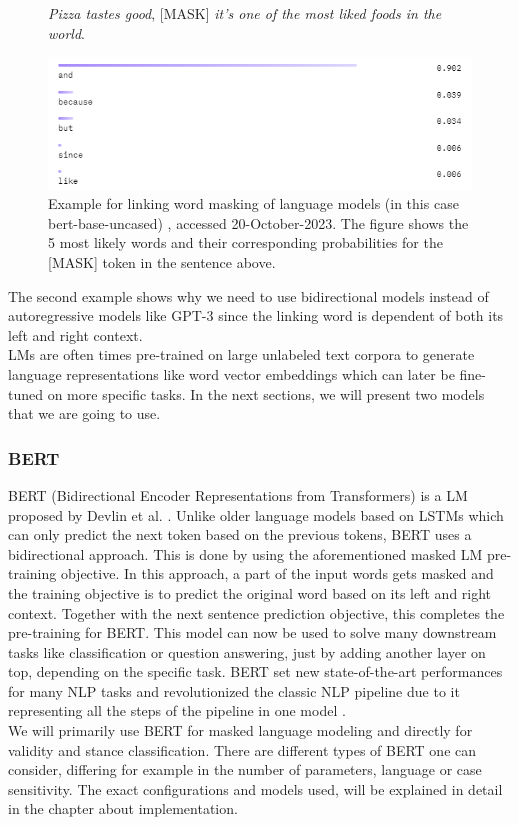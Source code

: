 \begin{figure}[H]
  \begin{center}
	\textit{Pizza tastes good}, [MASK] \textit{it's one of the most liked foods in the world}.
  \end{center}
  \centering
  \includegraphics[scale=0.9]{fig/bert_masking_example2.png}
  \caption{Example for linking word masking of language models (in this case bert-base-uncased) \cite{bertbaseuncased}, accessed 20-October-2023. The figure shows the 5 most likely words and their corresponding probabilities for the [MASK] token in the sentence above.}%
  \label{fig:bert_masking_example2}
\end{figure}

The second example shows why we need to use bidirectional models instead of autoregressive models like GPT-3 since the linking word is dependent of both its left and right context. \\
LMs are often times pre-trained on large unlabeled text corpora to generate language representations like word vector embeddings which can later be fine-tuned on more specific tasks. In the next sections, we will present two models that we are going to use.


\subsubsection{BERT}
BERT (Bidirectional Encoder Representations from Transformers) is a LM proposed by Devlin et al. \cite{bert}. Unlike older language models based on LSTMs which can only predict the next token based on the previous tokens, BERT uses a bidirectional approach. This is done by using the aforementioned masked LM pre-training objective. In this approach, a part of the input words gets masked and the training objective is to predict the original word based on its left and right context. Together with the next sentence prediction objective, this completes the pre-training for BERT. This model can now be used to solve many downstream tasks like classification or question answering, just by adding another layer on top, depending on the specific task. BERT set new state-of-the-art performances for many NLP tasks and revolutionized the classic NLP pipeline due to it representing all the steps of the pipeline in one model \cite{bertexplain}.  \\
We will primarily use BERT for masked language modeling and directly for validity and stance classification. There are different types of BERT one can consider, differing for example in the number of parameters, language or case sensitivity. The exact configurations and models used, will be explained in detail in the chapter about implementation. \\

